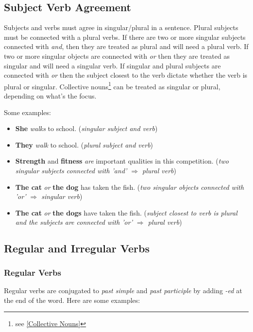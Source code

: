 \newpage
\subsection{Subject Verb Agreement}
\label{Subject Verb Agreement}
Subjects and verbs must agree in singular/plural in a sentence. Plural subjects must be connected with a plural verbs. If there are two or more singular subjects connected with \textit{and}, then they are treated as plural and will need a plural verb. If two or more singular objects are connected with \textit{or} then they are treated as singular and will need a singular verb. If singular and plural subjects are connected with \textit{or} then the subject closest to the verb dictate whether the verb is plural or singular. Collective nouns\footnote{see \ref{Collective Nouns}} can be treated as singular or plural, depending on what's the focus.

Some examples:
\begin{itemize}
    \item \textbf{She} \textit{walks} to school. (\textit{singular subject and verb})
    \item \textbf{They} \textit{walk} to school. (\textit{plural subject and verb})
    \item \textbf{Strength} and \textbf{fitness} \textit{are} important qualities in this competition. (\textit{two singular subjects connected with 'and' $ \Rightarrow $ plural verb})
    \item \textbf{The cat} \textit{or} \textbf{the dog} has taken the fish. (\textit{two singular objects connected with 'or' $ \Rightarrow $ singular verb})
    \item \textbf{The cat} \textit{or} \textbf{the dogs} have taken the fish. (\textit{subject closest to verb is plural and the subjects are connected with 'or' $ \Rightarrow $ plural verb})
\end{itemize}

\newpage
\subsection{Regular and Irregular Verbs}
\label{Regular and Irregular Verbs}
\subsubsection{Regular Verbs}
Regular verbs are conjugated to \textit{past simple} and \textit{past participle} by adding \textit{-ed} at the end of the word. Here are some examples:

